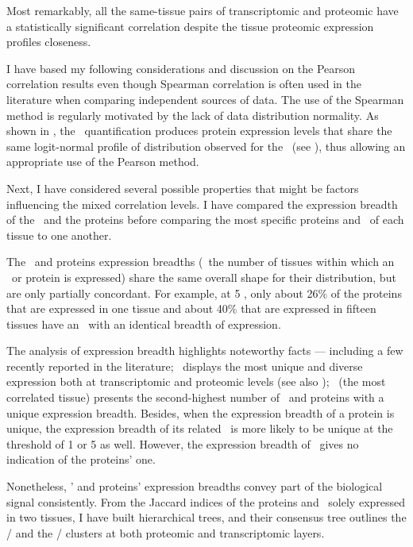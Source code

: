 Most remarkably,
all the same-tissue pairs of transcriptomic and proteomic
have a statistically significant correlation
despite the tissue proteomic expression profiles closeness.\mybr\

I have based my following considerations and discussion
on the Pearson correlation results
even though Spearman correlation is often used in the literature
when comparing independent sources of data.
The use of the Spearman method is regularly motivated
by the lack of data distribution normality.
As shown in ,
the \PPKM\ quantification produces protein expression levels
that share the same logit-normal profile of distribution
observed for the \mRNAs\ (see ),
thus allowing an appropriate use of the Pearson method.\mybr\

Next, I have considered several possible properties
that might be factors influencing the mixed correlation levels.
I have compared the expression breadth of the \mRNAs\ and the proteins
before comparing the most specific proteins and \mRNAs\ of each tissue
to one another.\mybr\

The \mRNAs\ and proteins expression breadths
(\ie\ the number of tissues within which an \mRNA\ or protein is expressed)
share the same overall shape for their distribution,
but are only partially concordant.
For example, at 5 \FPKM,
only about 26\% of the proteins that are expressed in one tissue
and about 40\% that are expressed in fifteen tissues have
an \mRNA\ with an identical breadth of expression.\mybr\

The analysis of expression breadth highlights noteworthy facts
--- including a few recently reported in the literature;
\testis\ displays the most unique and diverse expression
both at transcriptomic and proteomic levels
(see also \citet{Wang2019-ut,Zhang2015-yn});
\liver\ (the most correlated tissue) presents the second-highest number
of \mRNAs\ and proteins with a unique expression breadth.
Besides, when the expression breadth of a protein is unique,
the expression breadth of its related \mRNA\ is more likely to be unique
at the threshold of 1 or 5 \FPKM{} as well.
However, the expression breadth of \mRNAs\ gives no indication
of the proteins' one.\mybr\

Nonetheless, \mRNAs{}' and proteins' expression breadths convey
part of the biological signal consistently.
From the Jaccard indices of the proteins and \mRNAs\
solely expressed in two tissues,
I have built hierarchical trees,
and their consensus tree outlines
the \ovary{}/\testis{} and the \kidney{}/\liver{} clusters
at both proteomic and transcriptomic layers.\mybr\

